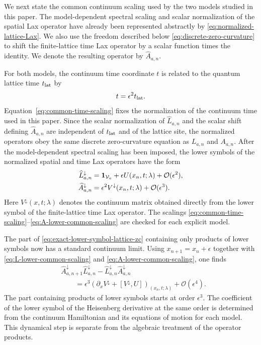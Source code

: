 We next state the common continuum scaling used by the two models studied in
this paper.  The model-dependent spectral scaling and scalar normalization of
the spatial Lax operator have already been represented abstractly by
\eqref{eq:normalized-lattice-Lax}.  We also use the freedom described below
\eqref{eq:discrete-zero-curvature} to shift the finite-lattice time Lax
operator by a scalar function times the identity.  We denote the resulting operator by
$\widehat{A}_{a,n}$.

For both models, the continuum time coordinate $t$ is related to the quantum
lattice time $t_{\rm lat}$ by
\begin{equation}
t=\epsilon^2 t_{\rm lat}.
\label{eq:common-time-scaling}
\end{equation}
Equation~\eqref{eq:common-time-scaling} fixes the normalization of the
continuum time used in this paper.  Since the scalar normalization of
$\widehat L_{a,n}$ and the scalar shift defining
$\widehat{A}_{a,n}$ are independent of $t_{\rm lat}$ and of the
lattice site, the normalized operators obey the same discrete zero-curvature
equation as $L_{a,n}$ and $A_{a,n}$.
After the model-dependent spectral scaling has been imposed, the lower symbols
of the normalized spatial and time Lax operators have the form
\begin{align}
\widehat L_{a,n}^{\downarrow}
&=
\mathbf{1}_{\mathcal V_a}
+\epsilon U(x_n,t;\lambda)
+\mathcal O(\epsilon^2),
\label{eq:L-lower-common-scaling}\\
\widehat{A}_{a,n}^{\downarrow}
&=
\epsilon^2 V^{\downarrow}(x_n,t;\lambda)
+\mathcal O(\epsilon^3).
\label{eq:A-lower-common-scaling}
\end{align}
Here $V^{\downarrow}(x,t;\lambda)$ denotes the continuum matrix obtained
directly from the lower symbol of the finite-lattice time Lax operator.  The scalings \eqref{eq:common-time-scaling}--\eqref{eq:A-lower-common-scaling}
are checked for each explicit model.

The part of \eqref{eq:exact-lower-symbol-lattice-zc} containing only products
of lower symbols now has a standard continuum limit.  Using
$x_{n+1}=x_n+\epsilon$ together with
\eqref{eq:L-lower-common-scaling} and
\eqref{eq:A-lower-common-scaling}, one finds
\begin{align}
&\widehat{A}_{a,n+1}^{\downarrow}
 \widehat L_{a,n}^{\downarrow}
-
 \widehat L_{a,n}^{\downarrow}
 \widehat{A}_{a,n}^{\downarrow}
\nonumber\\
&\qquad=
\epsilon^3
\left(
\partial_x V^{\downarrow}
+[V^{\downarrow},U]
\right)_{(x_n,t;\lambda)}
+\mathcal O(\epsilon^4).
\label{eq:factorized-continuum-zc}
\end{align}
The part containing products of lower symbols starts at order
$\epsilon^3$.  The coefficient of the lower symbol of the Heisenberg
derivative at the same order is determined from the continuum Hamiltonian and
its equations of motion for each model.  This dynamical step is separate from
the algebraic treatment of the operator products.

